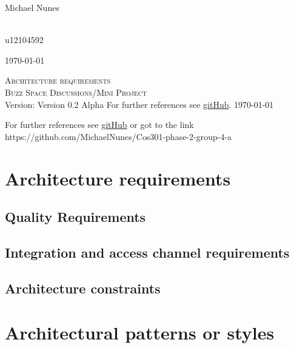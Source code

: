 \documentclass[a4paper,12pt]{report}
\begin{document}
\begin{titlepage}
\begin{center}
\begin{minipage}{0.4\textwidth}
\end{minipage}
\begin{minipage}{0.4\textwidth}
\begin{flushleft} \large
Michael {Nunes}
\end{flushleft}
\end{minipage}
\begin{minipage}{0.4\textwidth}
\begin{flushright} \large
\emph{} \\
u12104592
\end{flushright}
\end{minipage}
\vfill
{\large \today}
\end{center}
\end{titlepage}
\footnotesize
%
\normalsize

\renewcommand{\thesection}{\arabic{section}}
\newpage
\begin{center}
\textsc{\LARGE Architecture requirements}\\[1.5cm]
\textsc{\Large Buzz Space Discussions/Mini Project}\\[0.5cm]
Version: Version 0.2 Alpha 
For further references see \href{ https://github.com/MichaelNunes/Cos301-phase-2-group-4-a}{gitHub}.
\today
\end{center}
\tableofcontents{}
For further references see \href{https://github.com/MichaelNunes/Cos301-phase-2-group-4-a}{gitHub} or got to the link https://github.com/MichaelNunes/Cos301-phase-2-group-4-a

\section{Architecture requirements}

\subsection{Quality Requirements}
	
\subsection{Integration and access channel requirements}
	
\subsection{Architecture constraints}
	
\section{Architectural patterns or styles}
	
\end{document}
